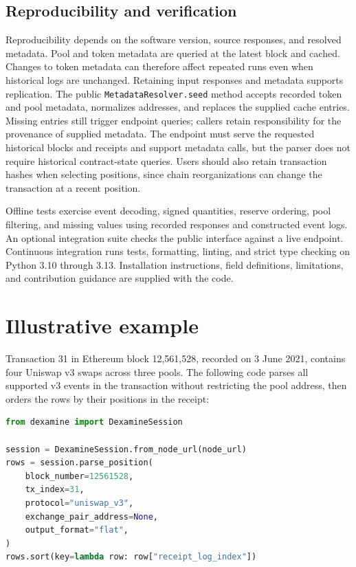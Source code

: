 \documentclass[11pt]{article}
\begin{document}
\subsection{Reproducibility and verification}
\label{subsec:verification}
Reproducibility depends on the software version, source responses, and resolved
metadata. Pool and token metadata are queried at the latest block and cached.
Changes to token metadata can therefore affect repeated runs even when historical
logs are unchanged. Retaining input responses and metadata supports replication.
The public \texttt{MetadataResolver.\allowbreak seed} method accepts recorded token and pool
metadata, normalizes addresses, and replaces the supplied cache entries. Missing
entries still trigger endpoint queries; callers retain responsibility for the
provenance of supplied metadata.
The endpoint must serve the requested historical blocks and receipts and support
metadata calls, but the parser does not require historical contract-state queries.
Users should also retain transaction hashes when selecting positions, since chain
reorganizations can change the transaction at a recent position.

Offline tests exercise event decoding, signed quantities, reserve ordering, pool
filtering, and missing values using recorded responses and constructed event logs.
An optional integration suite checks the public interface against a live endpoint.
Continuous integration runs tests, formatting, linting, and strict type checking on
Python 3.10 through 3.13. Installation instructions, field definitions, limitations,
and contribution guidance are supplied with the code.

\section{Illustrative example}
\label{sec:example}
Transaction 31 in Ethereum block 12,561,528, recorded on 3 June 2021, contains four
Uniswap v3 swaps across three pools. The following code parses all supported v3 events
in the transaction without restricting the pool address, then orders the rows by
their positions in the receipt:

\medskip
\begin{minipage}{\linewidth}
\begin{lstlisting}[language=Python]
from dexamine import DexamineSession

session = DexamineSession.from_node_url(node_url)
rows = session.parse_position(
    block_number=12561528,
    tx_index=31,
    protocol="uniswap_v3",
    exchange_pair_address=None,
    output_format="flat",
)
rows.sort(key=lambda row: row["receipt_log_index"])
\end{lstlisting}
\end{minipage}
\medskip
\end{document}
